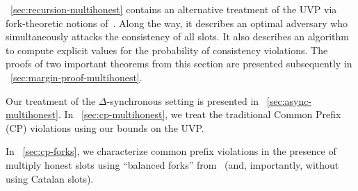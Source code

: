 \Section~\ref{sec:recursion-multihonest} contains an alternative treatment 
of the UVP via fork-theoretic notions of~\cite{LinearConsistency}. 
Along the way, it describes an optimal adversary who simultaneously attacks the consistency of all slots. 
It also describes an algorithm to compute explicit values 
for the probability of consistency violations. 
The proofs of two important theorems from this section 
are presented subsequently in \Section~\ref{sec:margin-proof-multihonest}.


Our treatment of the $\Delta$-synchronous setting is
presented in \Section~\ref{sec:async-multihonest}.  In \Section~\ref{sec:cp-multihonest}, we
treat the traditional Common Prefix (CP) violations using our bounds
on the UVP.  

In \Section~\ref{sec:cp-forks}, 
we characterize common prefix violations 
in the presence of multiply honest slots 
using ``balanced forks'' from~\cite{LinearConsistency} (and, importantly, 
without using Catalan slots).



